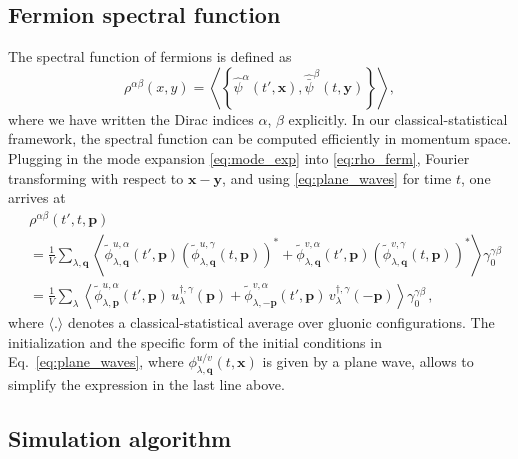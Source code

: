 \documentclass[]{webofc}
\def\be{\begin{equation}}
\def\ee{\end{equation}}
\newcommand{\mbf}{\mathbf}
\newcommand{\tpert}{t}
\newcommand{\eq}{Eq.~}
\newcommand{\non}{\nonumber \\}
\begin{document}

\subsection{Fermion spectral function}

The spectral function of fermions is defined as
\be
 \label{eq:rho_ferm}
 \rho^{\alpha \beta}(x,y) = \left\langle\left\lbrace \hat{\psi}^{\alpha}(t',\mbf x), \hat{\bar{\psi}}^{\beta}(\tpert,\mbf y) \right\rbrace\right\rangle,
\ee
where we have written the Dirac indices $\alpha$, $\beta$ explicitly. In our classical-statistical framework, the spectral function can be computed efficiently in momentum space. Plugging in the mode expansion \eqref{eq:mode_exp} into \eqref{eq:rho_ferm}, Fourier transforming with respect to $\mbf x - \mbf y$, and using \eqref{eq:plane_waves} for time $\tpert$, one arrives at
\begin{align}
 \label{eq:fermion_rho_calc}
 & \rho^{\alpha \beta}(t',\tpert,\mbf p) \\
 &= \frac{1}{V}\sum_{\lambda,\mbf q} \left\langle \tilde{\phi}^{u,\alpha}_{\lambda,\mbf q}(t',\mbf p) \left( \tilde{\phi}^{u,\gamma}_{\lambda,\mbf q}(\tpert,\mbf p) \right)^{*} + \tilde{\phi}^{v,\alpha}_{\lambda,\mbf q}(t',\mbf p) \left( \tilde{\phi}^{v,\gamma}_{\lambda,\mbf q}(\tpert,\mbf p) \right)^{*} \right\rangle \gamma_{0}^{\gamma\beta} \non
 &= \frac{1}{V}\sum_{\lambda} \left\langle \tilde{\phi}^{u,\alpha}_{\lambda,\mbf p}(t',\mbf p)\, u_{\lambda}^{\dagger,\gamma}(\mbf p) + \tilde{\phi}^{v,\alpha}_{\lambda,-\mbf p}(t',\mbf p)\, v_{\lambda}^{\dagger,\gamma}(-\mbf p) \right\rangle \gamma_{0}^{\gamma\beta}\,, \nonumber
\end{align}
where $\langle . \rangle$ denotes a classical-statistical average over gluonic configurations.
The initialization and the specific form of the initial conditions in \eq\eqref{eq:plane_waves}, where $\phi_{\lambda,\mbf q}^{u/v}(\tpert,\mbf x)$ is given by a plane wave, 
allows to simplify the expression in the last line above.


\subsection{Simulation algorithm}
\label{sec:simul_alg_fermions}
\end{document}
